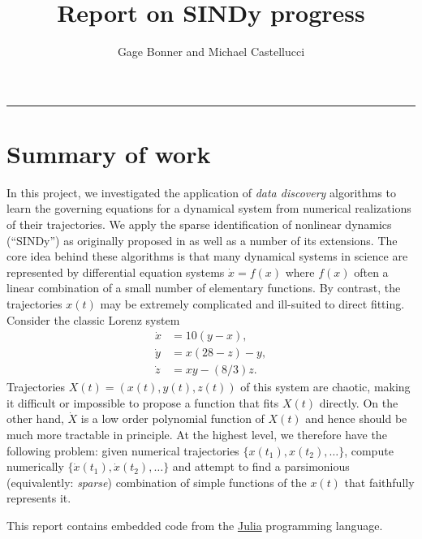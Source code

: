 \documentclass[
]{article}
\title{Report on SINDy progress}
\author{Gage Bonner and Michael Castellucci}
\date{}
\renewcommand*\contentsname{Table of contents}
\newcommand\contentsname{Table of contents}
\begin{document}
\maketitle

\renewcommand*\contentsname{Table of contents}
{
\hypersetup{linkcolor=}
\setcounter{tocdepth}{3}
\tableofcontents
}
\begin{center}\rule{0.5\linewidth}{0.5pt}\end{center}

\section{Summary of work}\label{summary-of-work}

In this project, we investigated the application of \emph{data
discovery} algorithms to learn the governing equations for a dynamical
system from numerical realizations of their trajectories. We apply the
sparse identification of nonlinear dynamics (``SINDy'') as originally
proposed in \cite{brunton2016discovering} as well as a number of its
extensions. The core idea behind these algorithms is that many dynamical
systems in science are represented by differential equation systems
\(\dot{x} = f(x)\) where \(f(x)\) often a linear combination of a small
number of elementary functions. By contrast, the trajectories \(x(t)\)
may be extremely complicated and ill-suited to direct fitting. Consider
the classic Lorenz system \begin{subequations} \label{eq:lorenz-def}
\begin{align} 
    \dot{x} &= 10 (y - x), \\
    \dot{y} &= x (28 - z) - y, \\ 
    \dot{z} &= x y - (8 / 3) z .
\end{align}
\end{subequations} Trajectories \(X(t) = (x(t), y(t), z(t))\) of this
system are chaotic, making it difficult or impossible to propose a
function that fits \(X(t)\) directly. On the other hand, \(\dot{X}\) is
a low order polynomial function of \(X(t)\) and hence should be much
more tractable in principle. At the highest level, we therefore have the
following problem: given numerical trajectories
\(\{x(t_1), x(t_2), \dots \}\), compute numerically
\(\{\dot{x}(t_1), \dot{x}(t_2), \dots \}\) and attempt to find a
parsimonious (equivalently: \emph{sparse}) combination of simple
functions of the \(x(t)\) that faithfully represents it.

This report contains embedded code from the
\href{https://julialang.org/}{Julia} programming language.
\end{document}

